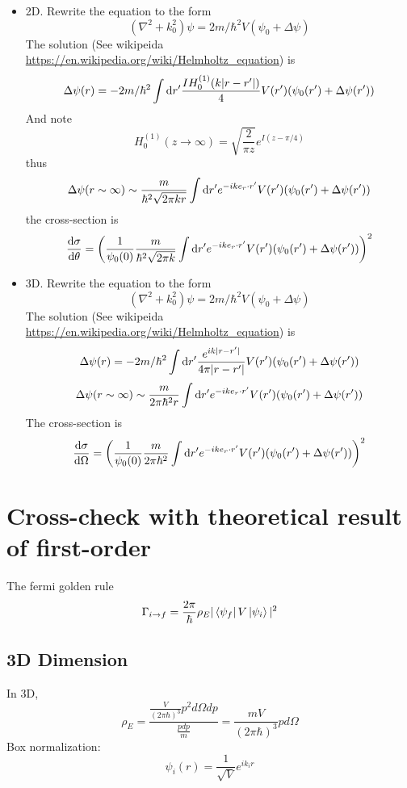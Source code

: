 \documentclass[12pt,twoside]{article}
\def\df{{\rm d}}
\begin{document}
\begin{itemize}
  \item 2D.
  Rewrite the equation to the form
  $$
  (\nabla^2 + k_0^2) \psi = 2m/\hbar^2 V (\psi_0+\Delta\psi)
  $$
  The solution (See wikipeida \url{https://en.wikipedia.org/wiki/Helmholtz_equation}) is
  $$
\Delta\psi(r) =-2m/\hbar^2 \int \df r^\prime  \frac{I H_0^{(1)}(k |r -r^\prime|)}{4} V(r^\prime) (\psi_0(r^\prime)+\Delta\psi(r^\prime))
  $$
  And note
  $$
  H_0^{(1)}(z\rightarrow\infty) = \sqrt{\frac{2}{\pi z}} e^{I (z - \pi/4)}
  $$
  thus
  $$
  \Delta\psi(r\sim\infty) \sim \frac{m}{\hbar^2 \sqrt{2\pi k r}} \int \df r^\prime e^{-i k e_r \cdot r^\prime} V(r^\prime) (\psi_0(r^\prime)+\Delta\psi(r^\prime))
  $$
  the cross-section is
  $$
  \frac{\df \sigma}{\df \theta} = \left(\frac{1}{\psi_0(0)}\frac{m}{\hbar^2 \sqrt{2\pi k}} \int \df r^\prime e^{-i k e_r \cdot r^\prime} V(r^\prime) (\psi_0(r^\prime)+\Delta\psi(r^\prime))\right)^2
  $$
  \item 3D.
  Rewrite the equation to the form
  $$
  (\nabla^2 + k_0^2) \psi = 2m/\hbar^2 V (\psi_0+\Delta\psi)
  $$
  The solution (See wikipeida \url{https://en.wikipedia.org/wiki/Helmholtz_equation}) is
  $$
\Delta\psi(r) =-2m/\hbar^2 \int \df r^\prime  \frac{e^{i k |r-r^\prime|}}{4\pi |r -r^\prime|} V(r^\prime) (\psi_0(r^\prime)+\Delta\psi(r^\prime))
  $$
    $$
\Delta\psi(r\sim\infty) \sim \frac{m}{2\pi\hbar^2 r} \int \df r^\prime e^{-i k e_r \cdot r^\prime} V(r^\prime) (\psi_0(r^\prime)+\Delta\psi(r^\prime))
  $$
  The cross-section is
  $$
  \frac{\df\sigma}{\df\Omega} = \left(\frac{1}{\psi_0(0)}\frac{m}{2\pi\hbar^2} \int \df r^\prime e^{-i k e_r \cdot r^\prime} V(r^\prime) (\psi_0(r^\prime)+\Delta\psi(r^\prime))\right)^2
  $$

\end{itemize}


\section{Cross-check with theoretical result of first-order}
The fermi golden rule
$$
\Gamma_{i\rightarrow f} = \frac{2\pi}{\hbar} \rho_E |\bra{\psi_f}V\ket{\psi_i}|^2
$$

\subsection{3D Dimension}

In 3D,
$$
\rho_E = \frac{
\frac{V}{(2\pi\hbar)^3}{ p^2 d\Omega dp}
}{
\frac{p dp}{m}
}
=
\frac{m V}{(2\pi\hbar)^3}{ p d\Omega}
$$
Box normalization:
$$
\psi_i(r) = \frac{1}{\sqrt{V}} e^{i k_i r}
$$
\end{document}
